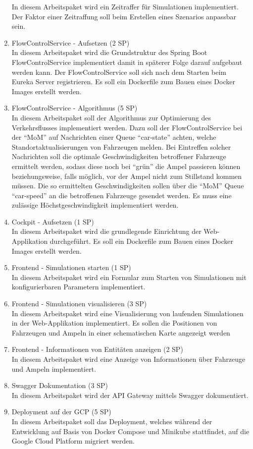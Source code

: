 \begin{enumerate}
  		In diesem Arbeitspaket wird ein Zeitraffer für Simulationen implementiert.
  		Der Faktor einer Zeitraffung soll beim Erstellen eines Szenarios anpassbar sein.
    \item FlowControlService - Aufsetzen (2 SP)\\
  		In diesem Arbeitspaket wird die Grundstruktur des Spring Boot FlowControlService implementiert damit in späterer Folge darauf aufgebaut werden kann.
  		Der FlowControlService soll sich nach dem Starten beim Eureka Server registrieren.
  		Es soll ein Dockerfile zum Bauen eines Docker Images erstellt werden.
  \item FlowControlService - Algorithmus (5 SP)\\
  		In diesem Arbeitspaket soll der Algorithmus zur Optimierung des Verkehrsflusses implementiert werden.
  		Dazu soll der FlowControlService bei der \enquote{MoM} auf Nachrichten einer Queue \enquote{car-state} achten, welche Standortaktualisierungen von Fahrzeugen melden.
  		Bei Eintreffen solcher Nachrichten soll die optimale Geschwindigkeiten betroffener Fahrzeuge ermittelt werden, sodass diese noch bei \enquote{grün} die Ampel passieren können beziehungsweise, falls möglich, vor der Ampel nicht zum Stillstand kommen müssen.
  		Die so ermittelten Geschwindigkeiten sollen über die \enquote{MoM} Queue \enquote{car-speed} an die betroffenen Fahrzeuge gesendet werden.
  		Es muss eine zulässige Höchstgeschwindigkeit implementiert werden.
  \item Cockpit - Aufsetzen (1 SP)\\
  		In diesem Arbeitspaket wird die grundlegende Einrichtung der Web-Applikation durchgeführt.
  		Es soll ein Dockerfile zum Bauen eines Docker Images erstellt werden.
  \item Frontend - Simulationen starten (1 SP)\\
 		In diesem Arbeitspaket wird ein Formular zum Starten von Simulationen mit konfigurierbaren Parametern implementiert.
  \item Frontend - Simulationen visualisieren (3 SP)\\
		In diesem Arbeitspaket wird eine Visualisierung von laufenden Simulationen in der Web-Applikation implementiert.
		Es sollen die Positionen von Fahrzeugen und Ampeln in einer schematischen Karte angezeigt werden
  \item Frontend - Informationen von Entitäten anzeigen (2 SP)\\
  		In diesem Arbeitspaket wird eine Anzeige von Informationen über Fahrzeuge und Ampeln implementiert.
  \item Swagger Dokumentation (3 SP)\\
  		In diesem Arbeitspaket wird der API Gateway mittels Swagger dokumentiert.
  \item Deployment auf der GCP (5 SP)\\
  		In diesem Arbeitspaket soll das Deployment, welches während der Entwicklung auf Basis von Docker Compose und Minikube stattfindet, auf die Google Cloud Platform migriert werden.
\end{enumerate}
